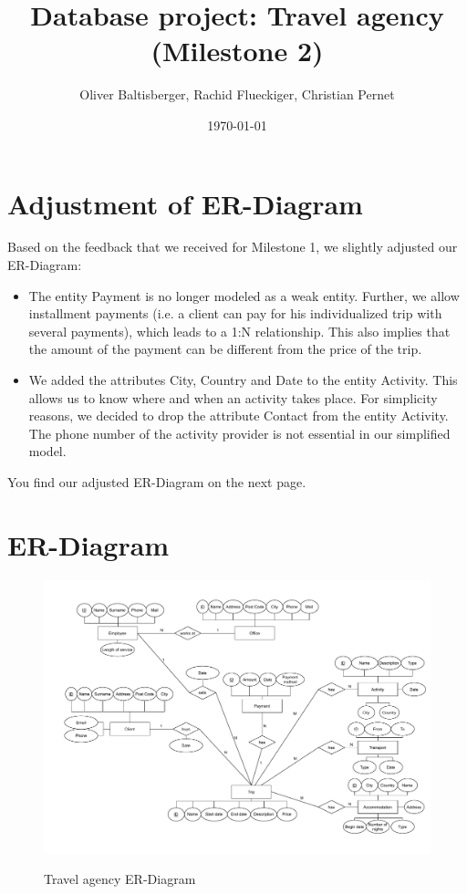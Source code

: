 \documentclass{article}
\title{Database project: Travel agency \\ (Milestone 2)}
\author{Oliver Baltisberger, Rachid Flueckiger, Christian Pernet}
\date{\today}
\begin{document}
	\maketitle
	
	\section*{Adjustment of ER-Diagram}
	Based on the feedback that we received for Milestone 1, we slightly adjusted our ER-Diagram:
	\begin{itemize}
		\item The entity Payment is no longer modeled as a weak entity. Further, we allow installment payments (i.e. a client can pay for his individualized trip with several payments), which leads to a 1:N relationship.
		This also implies that the amount of the payment can be different from the price of the trip.
		\item We added the attributes City, Country and Date to the entity Activity. This allows us to know where and when an activity takes place.
		For simplicity reasons, we decided to drop the attribute Contact from the entity Activity. The phone number of the activity provider is not essential in our simplified model.
	\end{itemize}
	
You find our adjusted ER-Diagram on the next page.
	\newpage
	
	\section*{ER-Diagram}
	\begin{figure}[htbp]
		\centering
			\includegraphics[width=1.15\textwidth, angle=90]{../Proposition 2b.pdf}
		\label{ER-Model}
		\caption{Travel agency ER-Diagram}
	\end{figure}
	
\end{document}
